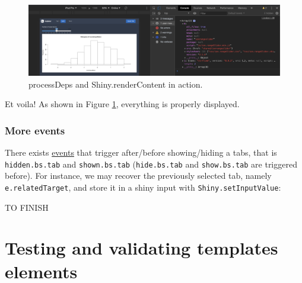 \documentclass[]{book}
\newenvironment{Shaded}{\begin{snugshade}}{\end{snugshade}}
\newcommand{\AttributeTok}[1]{\textcolor[rgb]{0.77,0.63,0.00}{#1}}
\newcommand{\KeywordTok}[1]{\textcolor[rgb]{0.13,0.29,0.53}{\textbf{#1}}}
\newcommand{\NormalTok}[1]{#1}
\newcommand{\OperatorTok}[1]{\textcolor[rgb]{0.81,0.36,0.00}{\textbf{#1}}}
\newcommand{\StringTok}[1]{\textcolor[rgb]{0.31,0.60,0.02}{#1}}
\newcommand{\VariableTok}[1]{\textcolor[rgb]{0.00,0.00,0.00}{#1}}
\begin{document}
\begin{figure}
\includegraphics[width=36.03in]{images/practice/process-deps} \caption{processDeps and Shiny.renderContent in action.}\label{fig:process-deps}
\end{figure}

Et voila! As shown in Figure \ref{fig:process-deps}, everything is properly displayed.

\hypertarget{more-events}{%
\subsection{More events}\label{more-events}}

There exists \href{https://getbootstrap.com/docs/4.0/components/navs/\#events}{events} that trigger after/before showing/hiding a tabs, that is \texttt{hidden.bs.tab} and \texttt{shown.bs.tab} (\texttt{hide.bs.tab} and \texttt{show.bs.tab} are triggered before). For instance, we may recover
the previously selected tab, namely \texttt{e.relatedTarget}, and store it in a shiny input with \texttt{Shiny.setInputValue}:

\begin{Shaded}
\end{Shaded}

TO FINISH

\hypertarget{custom-templates-testing}{%
\chapter{Testing and validating templates elements}\label{custom-templates-testing}}
\end{document}

